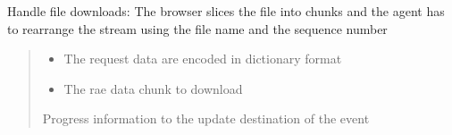 \documentclass[letterpaper,10pt,english]{sphinxmanual}
\begin{document}
\begin{savenotes}
\begin{fulllineitems}
\begin{savenotes}
\begin{fulllineitems}
\begin{quote}
\begin{description}
\end{description}\end{quote}

\end{fulllineitems}\end{savenotes}


\begin{savenotes}\begin{fulllineitems}
\label{\detokenize{eezz:eezz.http_agent.THttpAgent.handle_download}}
\pysigstartsignatures
{}
\pysigstopsignatures
\sphinxAtStartPar
Handle file downloads: The browser slices the file into chunks and the agent has to
re\sphinxhyphen{}arrange the stream using the file name and the sequence number
\begin{quote}\begin{description}
\begin{itemize}
\item {} 
\sphinxAtStartPar
{} \textendash{} The request data are encoded in dictionary format

\item {} 
\sphinxAtStartPar
{} \textendash{} The rae data chunk to download

\end{itemize}

\sphinxAtStartPar
Progress information to the update destination of the event

\end{description}\end{quote}

\end{fulllineitems}\end{savenotes}



\end{fulllineitems}
\end{savenotes}
\end{document}
